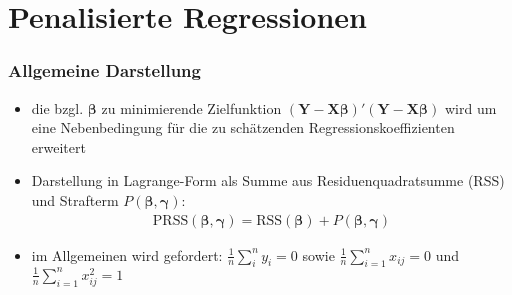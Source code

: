 \documentclass{beamer}
\begin{document}
\section{Penalisierte Regressionen}
\begin{frame} %
\frametitle{Allgemeine Darstellung}
  \begin{itemize}
  \item die bzgl. $\boldsymbol{\beta}$ zu minimierende Zielfunktion $(\mathbf{Y}-\mathbf{X}\boldsymbol{\beta})'(\mathbf{Y}-\mathbf{X}\boldsymbol{\beta})$ wird um eine Nebenbedingung für die zu schätzenden Regressionskoeffizienten erweitert 
  \item Darstellung in Lagrange-Form als Summe aus Residuenquadratsumme (RSS) und Strafterm $P(\boldsymbol{\beta}, \boldsymbol{\gamma})$:
  \begin{align*}
  \text{PRSS}(\boldsymbol{\beta}, \boldsymbol{\gamma})=\text{RSS}(\boldsymbol{\beta})+P(\boldsymbol{\beta}, \boldsymbol{\gamma})
  \end{align*}
  \item im Allgemeinen wird gefordert: $\frac{1}{n}\sum_{i}^{n}y_i =0$ sowie $\frac{1}{n}\sum_{i=1}^{n}x_{ij}=0$ und $\frac{1}{n}\sum_{i=1}^{n}x_{ij}^2=1$
  \end{itemize} 
\end{frame}
\end{document}

